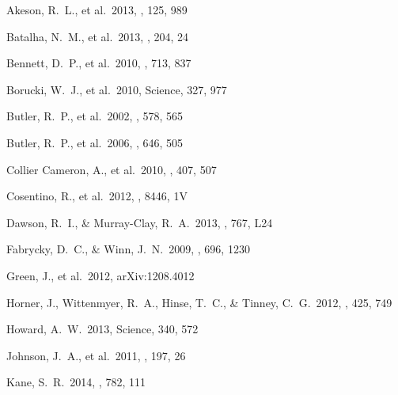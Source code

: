 \begin{thebibliography}

 Akeson, R.~L., et al.\ 2013, 
\pasp, 125, 989 %

 Batalha, N.~M., et al.\ 2013, 
\apjs, 204, 24 %

 Bennett, D.~P., et al.\ 2010, 
\apj, 713, 837 %

 Borucki, W.~J., et al.\ 2010, 
Science, 327, 977 %

 Butler, R.~P., et al.\ 2002, 
\apj, 578, 565 %

 Butler, R.~P., et al.\ 2006, 
\apj, 646, 505 %

 Collier 
Cameron, A., et al.\ 2010, \mnras, 407, 507 %

 Cosentino, R., et al.\ 
2012, \procspie, 8446, 1V %

 Dawson, R.~I., \&
  Murray-Clay, R.~A.\ 2013, \apjl, 767, L24  %

 Fabrycky, D.~C., \&
  Winn, J.~N.\ 2009, \apj, 696, 1230 %
  
 Green, J., et al.\ 2012, 
arXiv:1208.4012   %

 Horner, J., Wittenmyer, R.~A., 
Hinse, T.~C., \& Tinney, C.~G.\ 2012, \mnras, 425, 749 %

 Howard, A.~W.\ 2013, Science, 340,
  572 %

 Johnson, J.~A., et al.\ 2011, 
\apjs, 197, 26 %
  
 Kane, S.~R.\ 2014, \apj, 782, 111 %
  

\end{thebibliography}
